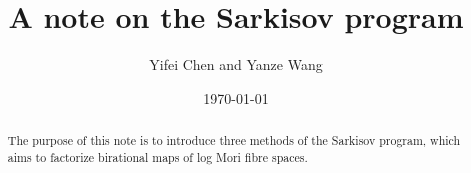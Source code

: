 \documentclass[11pt]{amsart}
\begin{document}
\title{A note on the Sarkisov program}

\author{Yifei Chen and Yanze Wang}

\begin{abstract}
  The purpose of this note is to introduce three methods of the Sarkisov program, which aims to factorize birational maps of log Mori fibre spaces.
\end{abstract}
\address{Academy of Mathematics and Systems Science,
  Chinese Academy of Sciences.
  No. 55 Zhonguancun East Road, Haidian District,
  Beijing 100190, P. R. China.}

\date{\today}


\maketitle

\tableofcontents
\end{document}
